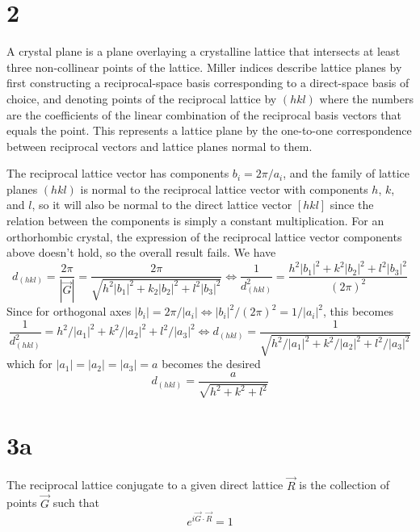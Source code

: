 \documentclass{article}
\begin{document}
\section*{2}
A crystal plane is a plane overlaying a crystalline lattice that intersects at least three non-collinear points of the lattice.
Miller indices describe lattice planes by first constructing a reciprocal-space basis corresponding to a direct-space basis
of choice, and denoting points of the reciprocal lattice by $(hkl)$ where the numbers are the coefficients of the linear combination of
the reciprocal basis vectors that equals the point.
This represents a lattice plane by the one-to-one correspondence between reciprocal vectors and lattice planes normal to them.

The reciprocal lattice vector has components $b_{i}=2\pi/a_{i}$, and the family of lattice planes $(hkl)$ is normal to the reciprocal
lattice vector with components $h$, $k$, and $l$, so it will also be normal to the direct lattice vector $[hkl]$ since the relation
between the components is simply a constant multiplication.
For an orthorhombic crystal, the expression of the reciprocal lattice vector components above doesn't hold, so the overall result fails.
We have
\[
  d_{(hkl)}=\frac{2\pi}{|\vec{G}|}=\frac{2\pi}{\sqrt{h^{2}|b_{1}|^{2}+k_{2}|b_{2}|^{2}+l^{2}|b_{3}|^{2}}}
  \Leftrightarrow \frac{1}{d_{(hkl)}^{2}}=\frac{h^{2}|b_{1}|^{2}+k^{2}|b_{2}|^{2}+l^{2}|b_{3}|^{2}}{(2\pi)^{2}}
\]
Since for orthogonal axes $|b_{i}|=2\pi/|a_{i}|\Leftrightarrow |b_{i}|^{2}/(2\pi)^{2}=1/|a_{i}|^{2}$, this becomes
\[
  \frac{1}{d^{2}_{(hkl)}}=h^{2}/|a_{1}|^{2}+k^{2}/|a_{2}|^{2}+l^{2}/|a_{3}|^{2}
  \Leftrightarrow d_{(hkl)}=\frac{1}{\sqrt{h^{2}/|a_{1}|^{2}+k^{2}/|a_{2}|^{2}+l^{2}/|a_{3}|^{2}}}
\]
which for $|a_{1}|=|a_{2}|=|a_{3}|=a$ becomes the desired
\[
  d_{(hkl)}=\frac{a}{\sqrt{h^{2}+k^{2}+l^{2}}}
\]

\section*{3a}
The reciprocal lattice conjugate to a given direct lattice $\vec{R}$ is the collection of points $\vec{G}$ such that
\[
  e^{i\vec{G}\cdot\vec{R}}=1
\]
\end{document}
